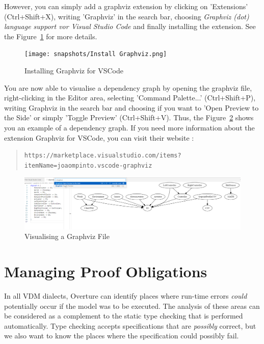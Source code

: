 \documentclass{overturerepchap}
\newcommand{\url}[1]{\texttt{#1}}
\begin{document}
However, you can simply add a graphviz extension by clicking on 'Extensions' (Ctrl+Shift+X), writing 'Graphviz' in the search bar, choosing \emph{Graphviz (dot) language support vor Visual Studio Code} and finally installing the extension. See the Figure~\ref{fig:installGraphviz} for more details.\\

\begin{figure}[htbp]
\begin{center}
\texttt{[image: snapshots/Install Graphviz.png]}
\caption{Installing Graphviz for VSCode\label{fig:installGraphviz}}
\end{center}
\end{figure}

You are now able to visualise a dependency graph by opening the graphviz file, right-clicking in the Editor area, selecting 'Command Palette...' (Ctrl+Shift+P), writing Graphviz in the search bar and choosing if you want to 'Open Preview to the Side' or simply 'Toggle Preview' (Ctrl+Shift+V). Thus, the Figure~\ref{fig:VisualisingGraphviz} shows you an example of a dependency graph. If you need more information about the extension Graphviz for VSCode, you can visit their website : 
 \begin{quote}
 \url{https://marketplace.visualstudio.com/items?itemName=joaompinto.vscode-graphviz}
 \end{quote}

\begin{figure}[htbp]
\begin{center}
\includegraphics[width=\textwidth]{snapshots/Use graphviz to show .dot file.png}
\caption{Visualising a Graphviz File\label{fig:VisualisingGraphviz}}
\end{center}
\end{figure}

\chapter{Managing Proof Obligations}\label{sec:POmanagement}

In all VDM dialects, Overture can identify places where run-time errors
\emph{could} potentially occur if the model was to be executed. The analysis of
these areas can be considered
as a complement to the static type checking that is performed automatically.
Type checking accepts specifications that are \emph{possibly} correct, but
we also want to know the places where the specification could possibly fail.
\end{document}
